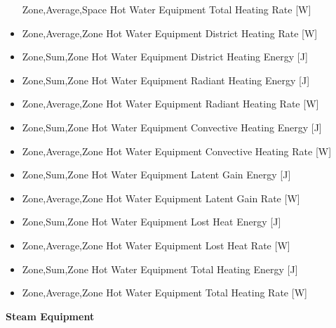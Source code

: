 \begin{itemize}
  Zone,Average,Space Hot Water Equipment Total Heating Rate {[}W{]}
\item
  Zone,Average,Zone Hot Water Equipment District Heating Rate {[}W{]}
\item
  Zone,Sum,Zone Hot Water Equipment District Heating Energy {[}J{]}
\item
  Zone,Sum,Zone Hot Water Equipment Radiant Heating Energy {[}J{]}
\item
  Zone,Average,Zone Hot Water Equipment Radiant Heating Rate {[}W{]}
\item
  Zone,Sum,Zone Hot Water Equipment Convective Heating Energy {[}J{]}
\item
  Zone,Average,Zone Hot Water Equipment Convective Heating Rate {[}W{]}
\item
  Zone,Sum,Zone Hot Water Equipment Latent Gain Energy {[}J{]}
\item
  Zone,Average,Zone Hot Water Equipment Latent Gain Rate {[}W{]}
\item
  Zone,Sum,Zone Hot Water Equipment Lost Heat Energy {[}J{]}
\item
  Zone,Average,Zone Hot Water Equipment Lost Heat Rate {[}W{]}
\item
  Zone,Sum,Zone Hot Water Equipment Total Heating Energy {[}J{]}
\item
  Zone,Average,Zone Hot Water Equipment Total Heating Rate {[}W{]}
\end{itemize}

\textbf{Steam Equipment}

